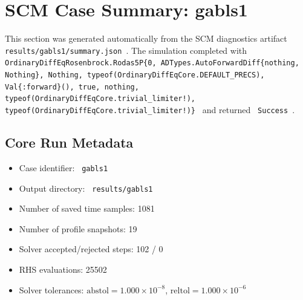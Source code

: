 \section{SCM Case Summary: gabls1}
\label{sec:scm_case_gabls1_gabls1_200x2m_12h_report}

This section was generated automatically from the SCM diagnostics artifact
\texttt{ results/gabls1/summary.json }. The simulation completed with \texttt{ OrdinaryDiffEqRosenbrock.Rodas5P\{0, ADTypes.AutoForwardDiff\{nothing, Nothing\}, Nothing, typeof(OrdinaryDiffEqCore.DEFAULT\_PRECS), Val\{:forward\}(), true, nothing, typeof(OrdinaryDiffEqCore.trivial\_limiter!), typeof(OrdinaryDiffEqCore.trivial\_limiter!)\} }
and returned \texttt{ Success }.

\subsection{Core Run Metadata}
\begin{itemize}
  \item Case identifier: \texttt{ gabls1 }
  \item Output directory: \texttt{ results/gabls1 }
  \item Number of saved time samples: 1081
  \item Number of profile snapshots: 19
  \item Solver accepted/rejected steps: 102 / 0
  \item RHS evaluations: 25502
  \item Solver tolerances: $\mathrm{abstol}=1.000 \times 10^{-8}$, $\mathrm{reltol}=1.000 \times 10^{-6}$
\end{itemize}

